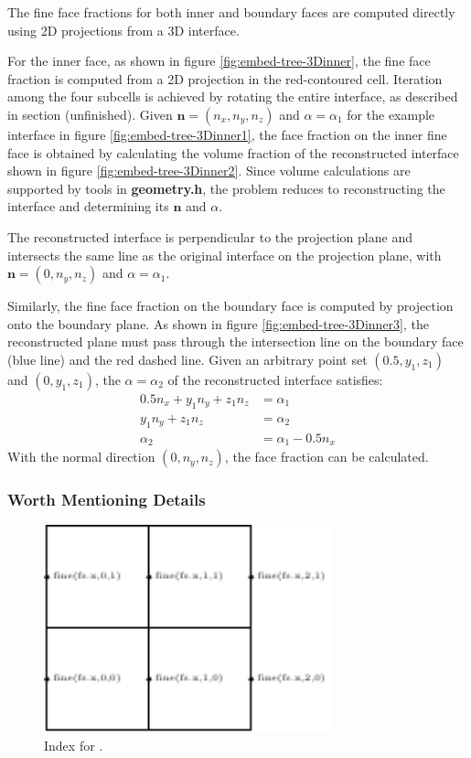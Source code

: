 The fine face fractions for both inner and boundary faces are computed directly using 2D projections from a 3D interface.

For the inner face, as shown in figure \ref{fig:embed-tree-3Dinner}, the fine face fraction is computed from a 2D projection in the red-contoured cell. Iteration among the four subcells is achieved by rotating the entire interface, as described in section (unfinished). Given $\mathbf{n} = (n_x, n_y, n_z)$ and $\alpha = \alpha_1$ for the example interface in figure \ref{fig:embed-tree-3Dinner1}, the face fraction on the inner fine face is obtained by calculating the volume fraction of the reconstructed interface shown in figure \ref{fig:embed-tree-3Dinner2}. Since volume calculations are supported by tools in \textbf{geometry.h}, the problem reduces to reconstructing the interface and determining its $\mathbf{n}$ and $\alpha$.

The reconstructed interface is perpendicular to the projection plane and intersects the same line as the original interface on the projection plane, with $\mathbf{n} = (0, n_y, n_z)$ and $\alpha = \alpha_1$.

Similarly, the fine face fraction on the boundary face is computed by projection onto the boundary plane. As shown in figure \ref{fig:embed-tree-3Dinner3}, the reconstructed plane must pass through the intersection line on the boundary face (blue line) and the red dashed line. Given an arbitrary point set $(0.5, y_1, z_1)$ and $(0, y_1, z_1)$, the $\alpha = \alpha_2$ of the reconstructed interface satisfies:
\begin{align}
    0.5 n_x + y_1 n_y + z_1 n_z &= \alpha_1\\
    y_1 n_y + z_1 n_z &= \alpha_2\\
    \alpha_2 &= \alpha_1 - 0.5 n_x \label{equ:embed-tree-alphabf}
\end{align}
With the normal direction $(0, n_y, n_z)$, the face fraction can be calculated.

\subsubsection{Worth Mentioning Details}
\begin{figure}[ht]
    \centering
    \includegraphics[height=6cm]{./image/embed-tree-h/fine.pdf}
    \caption{Index for .}
    \label{fig:embed-tree-finefunc}
\end{figure}


